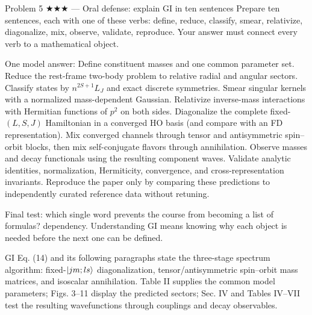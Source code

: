\documentclass[11pt]{article}
\begin{document}
\begin{problem}{Problem 5 ★★★ — Oral defense: explain GI in ten sentences}
Prepare ten sentences, each with one of these verbs: define, reduce, classify,
smear, relativize, diagonalize, mix, observe, validate, reproduce. Your answer
must connect every verb to a mathematical object.
\end{problem}
\begin{solution}
One model answer: Define constituent masses and one common parameter set. Reduce
the rest-frame two-body problem to relative radial and angular sectors. Classify
states by $n^{2S+1}L_J$ and exact discrete symmetries. Smear singular kernels
with a normalized mass-dependent Gaussian. Relativize inverse-mass interactions
with Hermitian functions of $p^2$ on both sides. Diagonalize the complete
fixed-$(L,S,J)$ Hamiltonian in a converged HO basis (and compare with an FD
representation). Mix converged channels through tensor and antisymmetric
spin--orbit blocks, then mix self-conjugate flavors through annihilation.
Observe masses and decay functionals using the resulting component waves.
Validate analytic identities, normalization, Hermiticity, convergence, and
cross-representation invariants. Reproduce the paper only by comparing these
predictions to independently curated reference data without retuning.
\end{solution}
\begin{quiz}
Final test: which single word prevents the course from becoming a list of
formulas? \answer dependency. Understanding GI means knowing why each object is
needed before the next one can be defined.
\end{quiz}

\begin{paperbridge}
GI Eq. (14) and its following paragraphs state the three-stage spectrum
algorithm: fixed-$\lvert jm;ls\rangle$ diagonalization, tensor/antisymmetric spin--orbit
mass matrices, and isoscalar annihilation. Table II supplies the common model
parameters; Figs. 3--11 display the predicted sectors; Sec. IV and Tables IV--VII
test the resulting wavefunctions through couplings and decay observables.
\end{paperbridge}
\end{document}
